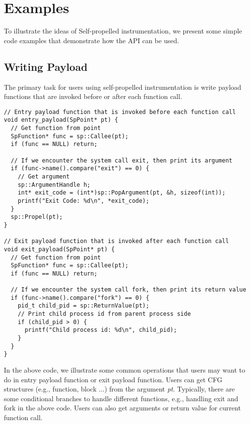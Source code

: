 \section{Examples}
To illustrate the ideas of Self-propelled instrumentation, we present some
simple code examples that demonstrate how the API can be used.

\subsection{Writing Payload}
The primary task for users using self-propelled instrumentation is write
payload
functions that are invoked before or after each function call.
\lstset{numbers=left}
\begin{lstlisting}[caption=Writing payload functions]
// Entry payload function that is invoked before each function call
void entry_payload(SpPoint* pt) {
  // Get function from point
  SpFunction* func = sp::Callee(pt);
  if (func == NULL) return;

  // If we encounter the system call exit, then print its argument
  if (func->name().compare("exit") == 0) {
    // Get argument
    sp::ArgumentHandle h;
    int* exit_code = (int*)sp::PopArgument(pt, &h, sizeof(int));
    printf("Exit Code: %d\n", *exit_code);
  }
  sp::Propel(pt);
}

// Exit payload function that is invoked after each function call
void exit_payload(SpPoint* pt) {
  // Get function from point
  SpFunction* func = sp::Callee(pt);
  if (func == NULL) return;

  // If we encounter the system call fork, then print its return value
  if (func->name().compare("fork") == 0) {
    pid_t child_pid = sp::ReturnValue(pt);
    // Print child process id from parent process side
    if (child_pid > 0) {
      printf("Child process id: %d\n", child_pid);
    }
  }
}
\end{lstlisting}
In the above code, we illustrate some common operations that users may want to
do in entry payload function or exit payload function.
Users can get CFG structures (e.g., function, block ...) from the argument {\em
  pt}.
Typically, there are some conditional branches to handle different functions,
e.g., handling exit and fork in the above code.
Users can also get arguments or return value for current function call.

